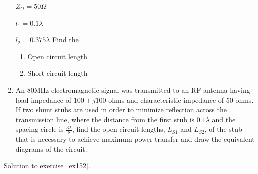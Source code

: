 \begin{ExerciseList}
\begin{enumerate}
$Z_O = 50 \varOmega$

$l_1 = 0.1 \lambda$


$l_2 = 0.375 \lambda$
Find the 
\begin{enumerate}[a]
	\item  Open circuit length
	\item  Short circuit length
\end{enumerate} 
\item An 80MHz electromagnetic signal was transmitted to an RF antenna having load impedance of \(100+j100\) ohms and characteristic impedance of 50 ohms. If two shunt stubs are used in order to minimize reflection across the transmission line, where the distance from the first stub is $0.1 \lambda$ and the spacing circle is \(\frac{3\lambda}{8}\), find the open circuit lengths, \(L_{S1}\) and \(L_{S2}\), of the stub that is necessary to achieve maximum power transfer and draw the equivalent diagrams of the circuit.





\end{enumerate}
\Answer[ref={ex153}]
Solution to exercise~\ref{ex152}.
\end{ExerciseList}